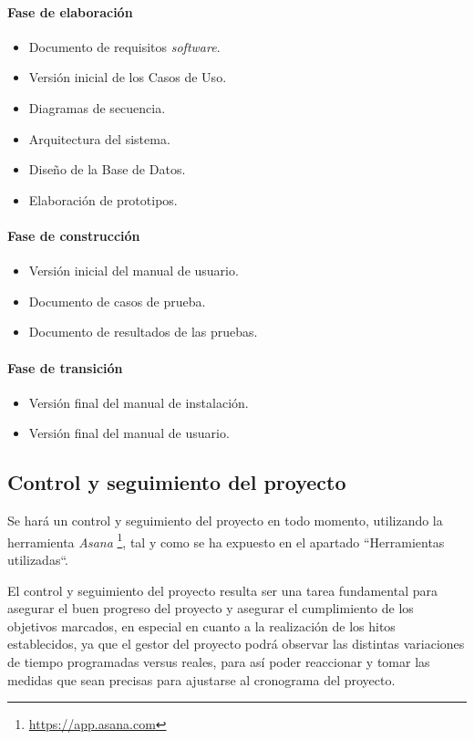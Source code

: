 \documentclass[twoside]{report}
\begin{document}
\paragraph{Fase de elaboración\\}
\begin{itemize}
\item Documento de requisitos \textit{software}.
\item Versión inicial de los Casos de Uso.
\item Diagramas de secuencia.
\item Arquitectura del sistema.
\item Diseño de la Base de Datos.
\item Elaboración de prototipos.
\end{itemize}

\paragraph{Fase de construcción\\}
\begin{itemize}
\item Versión inicial del manual de usuario.
\item Documento de casos de prueba.
\item Documento de resultados de las pruebas.
\end{itemize}

\paragraph{Fase de transición\\}
\begin{itemize}
\item Versión final del manual de instalación.
\item Versión final del manual de usuario.
\end{itemize}

\subsection{Control y seguimiento del proyecto}

Se hará un control y seguimiento del proyecto en todo momento, utilizando la herramienta \textit{Asana} \footnote{\url{https://app.asana.com}}, tal y como se ha expuesto en el apartado “Herramientas utilizadas“.

El control y seguimiento del proyecto resulta ser una tarea fundamental para asegurar el buen progreso del proyecto y asegurar el cumplimiento de los objetivos marcados, en especial en cuanto a la realización de los hitos establecidos, ya que el gestor del proyecto podrá observar las distintas variaciones de tiempo programadas versus reales, para así poder reaccionar y tomar las medidas que sean precisas para ajustarse al cronograma del proyecto.
\end{document}
